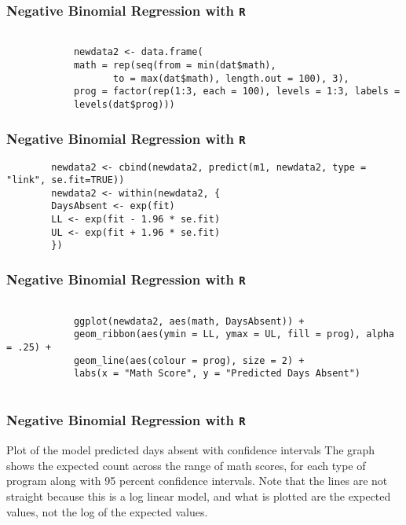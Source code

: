 \documentclass[00-GLMregslides.tex]{subfiles}
\begin{document}
		\begin{frame}[fragile]
		\frametitle{Negative Binomial Regression with \texttt{R} }
		\Large
		
		\begin{framed}
		\begin{verbatim}
		
			newdata2 <- data.frame(
			math = rep(seq(from = min(dat$math), 
			       to = max(dat$math), length.out = 100), 3),
			prog = factor(rep(1:3, each = 100), levels = 1:3, labels =
			levels(dat$prog)))
		\end{verbatim}	
		\end{framed}
		
		
		\end{frame}
	\begin{frame}[fragile]
	\frametitle{Negative Binomial Regression with \texttt{R} }
	\Large
	
	\begin{verbatim}
		newdata2 <- cbind(newdata2, predict(m1, newdata2, type = "link", se.fit=TRUE))
		newdata2 <- within(newdata2, {
		DaysAbsent <- exp(fit)
		LL <- exp(fit - 1.96 * se.fit)
		UL <- exp(fit + 1.96 * se.fit)
		})
	\end{verbatim}

\end{frame}

	\begin{frame}[fragile]
		\frametitle{Negative Binomial Regression with \texttt{R} }
		\large
		
		\begin{framed}
			\begin{verbatim}
			
			ggplot(newdata2, aes(math, DaysAbsent)) +
			geom_ribbon(aes(ymin = LL, ymax = UL, fill = prog), alpha = .25) +
			geom_line(aes(colour = prog), size = 2) +
			labs(x = "Math Score", y = "Predicted Days Absent")
			
			\end{verbatim}	
		\end{framed}
		
\end{frame}
\begin{frame}[fragile]
	\frametitle{Negative Binomial Regression with \texttt{R} }
	\Large
	
	Plot of the model predicted days absent with confidence intervals
	The graph shows the expected count across the range of math scores, for each type of program along with 95 percent confidence intervals. Note that the lines are not straight because this is a log linear model, and what is plotted are the expected values, not the log of the expected values.
\end{frame}
\end{document}
